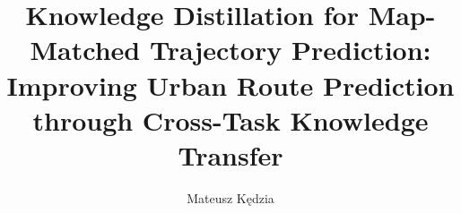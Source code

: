 \documentclass[runningheads]{llncs}
\begin{document}

\title{Knowledge Distillation for Map-Matched Trajectory Prediction: Improving Urban Route Prediction through Cross-Task Knowledge Transfer}
\author{Mateusz K{\k e}dzia}
\maketitle



\newpage
















\newpage





\end{document}
